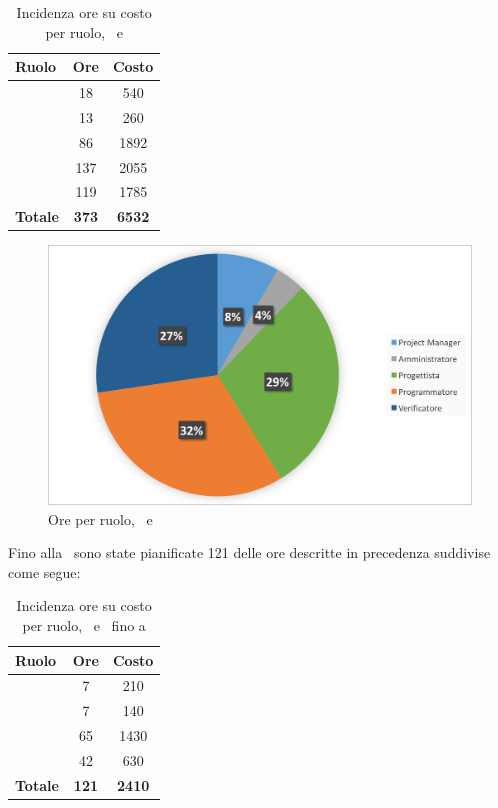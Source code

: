 \begin{table}[h]
	\begin{center}
		\begin{tabular}{|l|c|c|}
			\hline
			\textbf{Ruolo}	& \textbf{Ore} &	\textbf{Costo}	 \\
			\hline
						\Pm &	18 & 540\\
			\hline
			\Am	&	13 & 260\\
			\hline
			\Prog	&	86 & 1892\\
			\hline
			\Progr	&	137 & 2055\\
			\hline
			\Ver	&	119 & 1785\\
			\hline
			\textbf{Totale} &	 \textbf{373}	&	\textbf{6532}\\
			\hline
		\end{tabular}
	\end{center}
	\caption{Incidenza ore su costo per ruolo, \PD\ e \COD}
\end{table}

\begin{figure}[H]
	\centering 
	\includegraphics[scale=0.7]{Immagini/GraficiTorteSezione6/PDCOD.png}
	\caption{Ore per ruolo, \PD\ e \COD}
\end{figure}

\newpage
Fino alla \RP\ sono state pianificate 121 delle ore descritte in precedenza suddivise come segue:

\begin{table}[h]
	\begin{center}
		\begin{tabular}{|l|c|c|}
			\hline
			\textbf{Ruolo}	& \textbf{Ore} &	\textbf{Costo}	\\
			\hline
			\Pm &	7 & 210\\
			\hline
			\Am	&	7 & 140\\
			\hline
			\Prog	&	65 & 1430\\
			\hline
			\Ver	&	42 & 630\\
			\hline
			\textbf{Totale} &	 \textbf{121}	&	\textbf{2410}\\
			\hline
		\end{tabular}
	\end{center}
	\caption{Incidenza ore su costo per ruolo, \PD\ e \COD\ fino a \RP}
\end{table}

